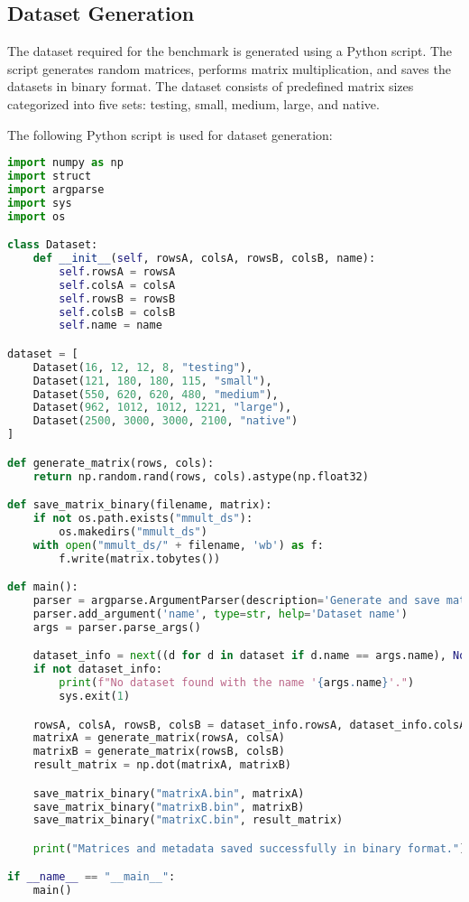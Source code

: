 \documentclass[12pt]{article}
\begin{document}
\subsection{Dataset Generation}
The dataset required for the benchmark is generated using a Python script. The script generates random matrices, performs matrix multiplication, and saves the datasets in binary format. The dataset consists of predefined matrix sizes categorized into five sets: testing, small, medium, large, and native.

The following Python script is used for dataset generation:
\begin{lstlisting}[language=Python, style=customc, caption=Dataset Generation Script]
import numpy as np
import struct
import argparse
import sys
import os

class Dataset:
    def __init__(self, rowsA, colsA, rowsB, colsB, name):
        self.rowsA = rowsA
        self.colsA = colsA
        self.rowsB = rowsB
        self.colsB = colsB
        self.name = name

dataset = [
    Dataset(16, 12, 12, 8, "testing"),
    Dataset(121, 180, 180, 115, "small"),
    Dataset(550, 620, 620, 480, "medium"),
    Dataset(962, 1012, 1012, 1221, "large"),
    Dataset(2500, 3000, 3000, 2100, "native")
]

def generate_matrix(rows, cols):
    return np.random.rand(rows, cols).astype(np.float32)

def save_matrix_binary(filename, matrix):
    if not os.path.exists("mmult_ds"):
        os.makedirs("mmult_ds")
    with open("mmult_ds/" + filename, 'wb') as f:
        f.write(matrix.tobytes())

def main():
    parser = argparse.ArgumentParser(description='Generate and save matrices in binary format.')
    parser.add_argument('name', type=str, help='Dataset name')
    args = parser.parse_args()

    dataset_info = next((d for d in dataset if d.name == args.name), None)
    if not dataset_info:
        print(f"No dataset found with the name '{args.name}'.")
        sys.exit(1)

    rowsA, colsA, rowsB, colsB = dataset_info.rowsA, dataset_info.colsA, dataset_info.rowsB, dataset_info.colsB
    matrixA = generate_matrix(rowsA, colsA)
    matrixB = generate_matrix(rowsB, colsB)
    result_matrix = np.dot(matrixA, matrixB)

    save_matrix_binary("matrixA.bin", matrixA)
    save_matrix_binary("matrixB.bin", matrixB)
    save_matrix_binary("matrixC.bin", result_matrix)

    print("Matrices and metadata saved successfully in binary format.")

if __name__ == "__main__":
    main()
\end{lstlisting}
\end{document}
